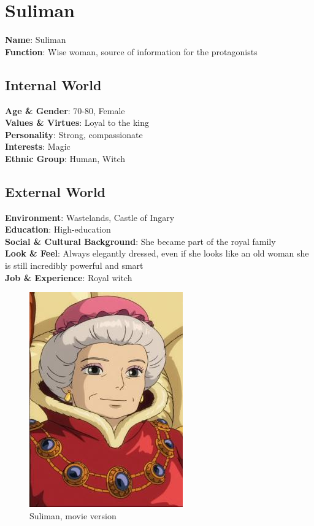 \section{Suliman}

\begin{minipage}{0.5\textwidth}
\textbf{Name}: Suliman\\
\textbf{Function}: Wise woman, source of information for the protagonists

\subsection{Internal World}

\textbf{Age \& Gender}: 70-80, Female \\
\textbf{Values \& Virtues}: Loyal to the king \\
\textbf{Personality}: Strong, compassionate\\
\textbf{Interests}: Magic \\
\textbf{Ethnic Group}: Human, Witch

\subsection{External World}
\textbf{Environment}: Wastelands, Castle of Ingary \\
\textbf{Education}: High-education \\
\textbf{Social \& Cultural Background}: She became part of the royal family \\
\textbf{Look \& Feel}: Always elegantly dressed, even if she looks like an old woman she is still incredibly powerful and smart \\
\textbf{Job \& Experience}: Royal witch\\

\end{minipage}%
%
\hfill\begin{minipage}{0.4\textwidth}
  \begin{figure}[H]
  \includegraphics{Images/Characters/suliman}
  \caption{Suliman, movie version}
\end{figure}
\end{minipage}

